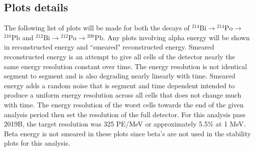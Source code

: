 \subsection{Plots details}
The following list of plots will be made for both the decays of $^{214}\textrm{Bi}\rightarrow$$^{214}\textrm{Po}\rightarrow$$^{210}\textrm{Pb}$ and $^{212}\textrm{Bi}\rightarrow$$^{212}\textrm{Po}\rightarrow$$^{208}\textrm{Pb}$. Any plots involving alpha energy will be shown in reconstructed energy and ``smeared" reconstructed energy. Smeared reconstructed energy is an attempt to give all cells of the detector nearly the same energy resolution constant over time. The energy resolution is not identical segment to segment and is also degrading nearly linearly with time. Smeared energy adds a random noise that is segment and time dependent intended to produce a uniform energy resolution across all cells that does not change much with time. The energy resolution of the worst cells towards the end of the given analysis period then set the resolution of the full detector. For this analysis pass 2019B, the target resolution was 325 PE/MeV or approximately 5.5\% at 1 MeV. Beta energy is not smeared in these plots since beta's are not used in the stability plots for this analysis.
